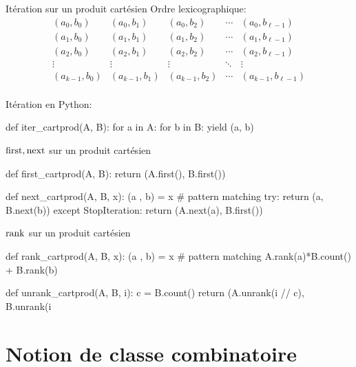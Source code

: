 \documentclass{beamer}
\begin{document}
\begin{frame}[fragile]{Itération sur un produit cartésien}
  Ordre lexicographique:
    \[\begin{array}{ccccc}
      (a_0, b_0)& (a_0, b_1)& (a_0, b_2)&\cdots&(a_0, b_{\ell-1})\\
      (a_1, b_0)& (a_1, b_1)& (a_1, b_2)&\cdots&(a_1, b_{\ell-1})\\
      (a_2, b_0)& (a_2, b_1)& (a_2, b_2)&\cdots&(a_2, b_{\ell-1})\\
      \vdots&\vdots& \vdots  &\ddots&   \vdots\\
      (a_{k-1},b_0)& (a_{k-1},b_1)&(a_{k-1},b_2)&\cdots&(a_{k-1},b_{\ell-1})\\
      \end{array}\]

  Itération en Python:
\begin{listing}{1}
    def iter_cartprod(A, B):
        for a in A:
            for b in B:
                yield (a, b)
\end{listing}
\end{frame}

\begin{frame}[fragile]{$\operatorname{first}, \operatorname{next}$ sur un produit cartésien}
\begin{listing}{1}
    def first_cartprod(A, B):
        return (A.first(), B.first())

    def next_cartprod(A, B, x):
        (a , b) = x      # pattern matching
        try:
           return (a, B.next(b))
        except StopIteration:
           return (A.next(a), B.first())
\end{listing}
\end{frame}


\begin{frame}[fragile]{$\operatorname{rank}$ sur un produit cartésien}
\begin{listing}{1}
    def rank_cartprod(A, B, x):
        (a , b) = x      # pattern matching
        A.rank(a)*B.count() + B.rank(b)

    def unrank_cartprod(A, B, i):
        c = B.count()
        return (A.unrank(i // c), B.unrank(i %
\end{listing}
\end{frame}


\section{Notion de classe combinatoire}
\end{document}
